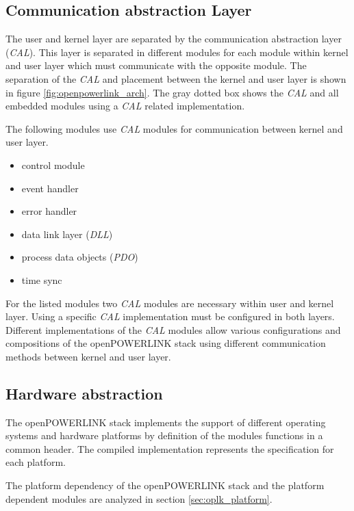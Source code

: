 \subsection{Communication abstraction Layer}
\label{sec:oplk_architecture_cal}

The user and kernel layer are separated by the communication abstraction layer (\emph{CAL}).
This layer is separated in different modules for each module within kernel and user layer which must communicate with the opposite module.
The separation of the \emph{CAL} and placement between the kernel and user layer is shown in figure \ref{fig:openpowerlink_arch}.
The gray dotted box shows the \emph{CAL} and all embedded modules using a \emph{CAL} related implementation.

The following modules use \emph{CAL} modules for communication between kernel and user layer. 

\begin{itemize}
    \item control module
    \item event handler
    \item error handler
    \item data link layer (\emph{DLL})
    \item process data objects (\emph{PDO})
    \item time sync
\end{itemize}

For the listed modules two \emph{CAL} modules are necessary within user and kernel layer.
Using a specific \emph{CAL} implementation must be configured in both layers.
Different implementations of the \emph{CAL} modules allow various configurations and compositions of the openPOWERLINK stack using different communication methods between kernel and user layer. \cite[CAL]{openpowerlink_doc}

\subsection{Hardware abstraction}
\label{sec:oplk_architecture_hardware}
The openPOWERLINK stack implements the support of different operating systems and hardware platforms by definition of the modules functions in a common header.
The compiled implementation represents the specification for each platform.

The platform dependency of the openPOWERLINK stack and the platform dependent modules are analyzed in section \ref{sec:oplk_platform}.

